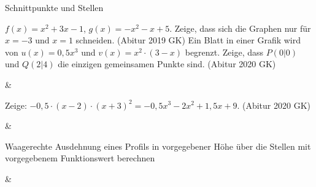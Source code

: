 \begin{aufgabe}{Schnittpunkte und Stellen}
\begin{gleichungsraster}[2]
\end{gleichungsraster}
\begin{teile}
\teil $f(x) = x^2 + 3x - 1$, $g(x) = -x^2 - x + 5$. Zeige, dass sich die Graphen nur für $x = -3$ und $x = 1$ schneiden. \hfill (Abitur 2019 GK)
\teil Ein Blatt in einer Grafik wird von $u(x) = 0{,}5x^3$ und $v(x) = x^2 \cdot (3 - x)$ begrenzt. Zeige, dass $P(0 | 0)$ und $Q(2 | 4)$ die einzigen gemeinsamen Punkte sind. \hfill (Abitur 2020 GK)
\end{teile}
\begin{gleichungsraster}[2]
 &
\end{gleichungsraster}
\begin{teile}
\teil Zeige: $-0{,}5 \cdot (x - 2) \cdot (x + 3)^2 = -0{,}5x^3 - 2x^2 + 1{,}5x + 9$. \hfill (Abitur 2020 GK)
\end{teile}
\begin{gleichungsraster}[2]
 & \\
\end{gleichungsraster}
\end{aufgabe}

\begin{aufgabe}{Waagerechte Ausdehnung eines Profils in vorgegebener Höhe über die Stellen mit vorgegebenem Funktionswert berechnen}
\begin{gleichungsraster}[2]
 & \\
\end{gleichungsraster}
\end{aufgabe}

